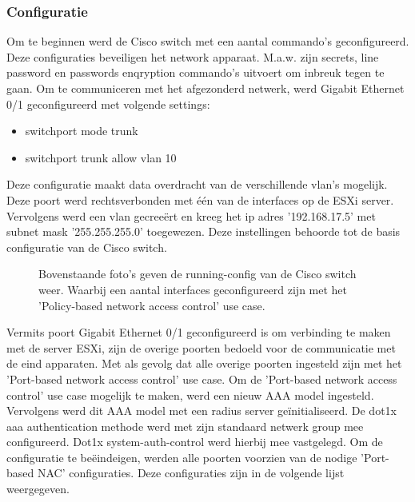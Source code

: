 \subsubsection{Configuratie}
Om te beginnen werd de Cisco switch met een aantal commando's geconfigureerd. Deze configuraties beveiligen het network apparaat. M.a.w. zijn secrets, line password en passwords enqryption commando's uitvoert om inbreuk tegen te gaan. 
\newline
\newline
Om te communiceren met het afgezonderd netwerk, werd Gigabit Ethernet 0/1 geconfigureerd met volgende settings: 

\begin{itemize}
	\item switchport mode trunk
	\item switchport trunk allow vlan 10 
\end{itemize}

Deze configuratie maakt data overdracht van de verschillende vlan's mogelijk. Deze poort werd rechtsverbonden met één van de interfaces op de ESXi server. Vervolgens werd een vlan gecreeërt en kreeg het ip adres '192.168.17.5' met subnet mask '255.255.255.0' toegewezen. Deze instellingen behoorde tot de basis configuratie van de Cisco switch.

\begin{figure}[H]
	\centering
	\qquad
	\qquad
	\caption{Bovenstaande foto's geven de running-config van de Cisco switch weer. Waarbij een aantal interfaces geconfigureerd zijn met het 'Policy-based network access control' use case.}%
	\label{fig:RunningConfig}%
\end{figure}

Vermits poort Gigabit Ethernet 0/1 geconfigureerd is om verbinding te maken met de server ESXi, zijn de overige poorten bedoeld voor de communicatie met de eind apparaten. Met als gevolg dat alle overige poorten ingesteld zijn met het 'Port-based network access control' use case.
\newline
\newline
Om de 'Port-based network access control' use case mogelijk te maken, werd een nieuw AAA model ingesteld. Vervolgens werd dit AAA model met een radius server geïnitialiseerd. De dot1x aaa authentication methode werd met zijn standaard netwerk group mee configureerd. 
\newline
\newline
Dot1x system-auth-control werd hierbij mee vastgelegd. Om de configuratie te beëindeigen, werden alle poorten voorzien van de nodige 'Port-based NAC' configuraties. Deze configuraties zijn in de volgende lijst weergegeven.

